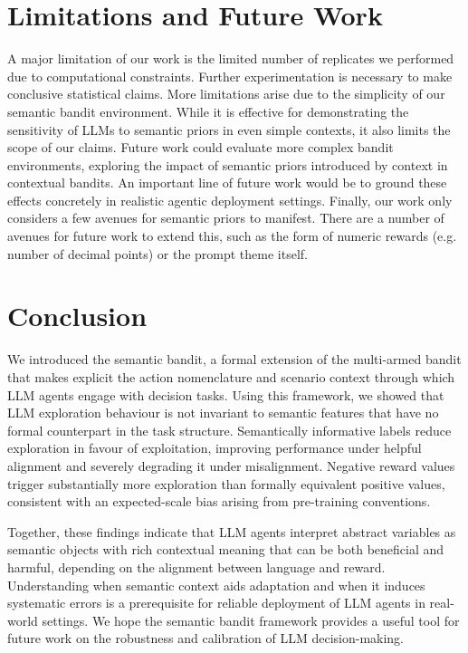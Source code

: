 \documentclass{article} %
\begin{document}
\section{Limitations and Future Work}
A major limitation of our work is the limited number of replicates we performed due to computational constraints. Further experimentation is necessary to make conclusive statistical claims. More limitations arise due to the simplicity of our semantic bandit environment. While it is effective for demonstrating the sensitivity of LLMs to semantic priors in even simple contexts, it also limits the scope of our claims. Future work could evaluate more complex bandit environments, exploring the impact of semantic priors introduced by context in contextual bandits. An important line of future work would be to ground these effects concretely in realistic agentic deployment settings. Finally, our work only considers a few avenues for semantic priors to manifest. There are a number of avenues for future work to extend this, such as the form of numeric rewards (e.g. number of decimal points) or the prompt theme itself. 

\section{Conclusion}
We introduced the semantic bandit, a formal extension of the multi-armed bandit that makes explicit the action nomenclature and scenario context through which LLM agents engage with decision tasks. Using this framework, we showed that LLM exploration behaviour is not invariant to semantic features that have no formal counterpart in the task structure. Semantically informative labels reduce exploration in favour of exploitation, improving performance under helpful alignment and severely degrading it under misalignment. Negative reward values trigger substantially more exploration than formally equivalent positive values, consistent with an expected-scale bias arising from pre-training conventions.

Together, these findings indicate that LLM agents interpret abstract variables as semantic objects with rich contextual meaning that can be both beneficial and harmful, depending on the alignment between language and reward. Understanding when semantic context aids adaptation and when it induces systematic errors is a prerequisite for reliable deployment of LLM agents in real-world settings. We hope the semantic bandit framework provides a useful tool for future work on the robustness and calibration of LLM decision-making.
\end{document}
